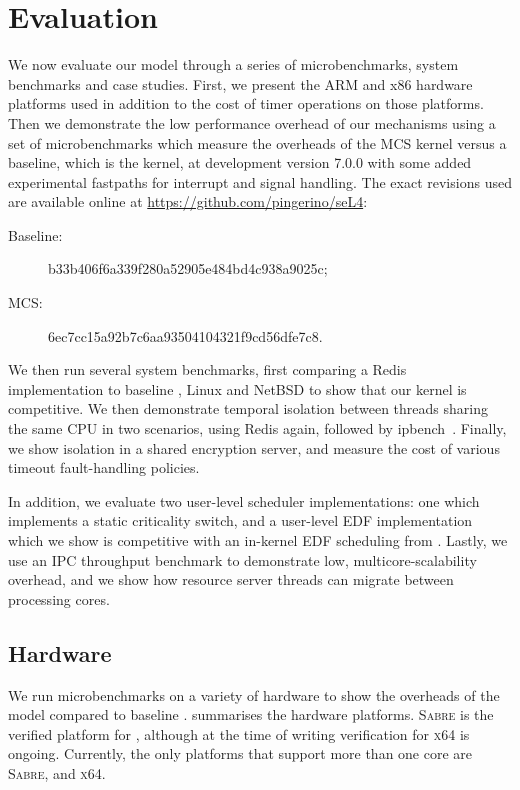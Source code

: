 \chapter{Evaluation}
\label{chap:evaluation}

We now evaluate our model through a series of microbenchmarks, system benchmarks and case studies.
First, we present the ARM and x86 hardware platforms used in addition to the cost of timer operations on those
platforms. Then we demonstrate the low performance overhead of our mechanisms using a set of 
microbenchmarks which measure the overheads of the MCS kernel versus a baseline, which is the \selfour
kernel, at development version 7.0.0 with some added experimental fastpaths for interrupt and signal
handling. The exact revisions used are available online at \url{https://github.com/pingerino/seL4}:
\begin{description}
    \item[Baseline:] b33b406f6a339f280a52905e484bd4c938a9025c;
    \item[MCS:] 6ec7cc15a92b7c6aa93504104321f9cd56dfe7c8.
\end{description}

We then run several system benchmarks, first comparing a Redis~\citep{redis:url} 
implementation to baseline \selfour, Linux and NetBSD to show that our kernel is competitive.
We then demonstrate temporal
isolation between threads sharing the same CPU in two scenarios,
using Redis again, followed by ipbench~\citep{Wienand_Macpherson_04}. Finally, we show isolation in a
shared encryption server, and measure the cost of various timeout fault-handling policies. 

In addition, we evaluate two user-level scheduler implementations: one which implements a static
criticality switch, and a user-level \gls{EDF} implementation which we show is
competitive with an in-kernel \gls{EDF} scheduling from \litmus. Lastly, we use an \gls{IPC}
throughput benchmark to demonstrate low, multicore-scalability overhead, and we show 
how resource server threads can migrate between processing cores.

\section{Hardware}

We run microbenchmarks on a variety of hardware to show the overheads of the model compared to
baseline \selfour.  summarises the hardware platforms. \textsc{Sabre} is
the verified platform for \selfour, although at the time of writing verification for \textsc{x64} is
ongoing. Currently, the only platforms that support more than one core are \textsc{Sabre},
and \textsc{x64}.

